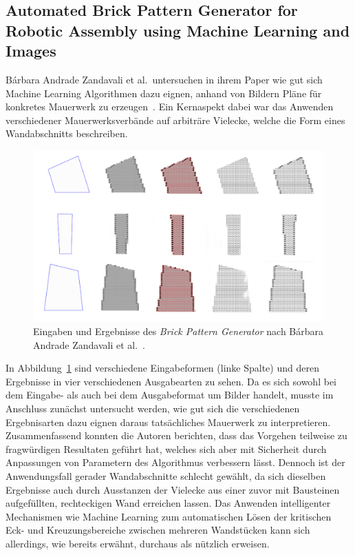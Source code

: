 \subsection{Automated Brick Pattern Generator for Robotic Assembly using Machine Learning and Images}
Bárbara Andrade Zandavali et al.\ untersuchen in ihrem Paper wie gut sich Machine Learning Algorithmen dazu eignen, anhand von Bildern Pläne für konkretes Mauerwerk zu erzeugen~\cite{Zandavali2019}.
Ein Kernaspekt dabei war das Anwenden verschiedener Mauerwerksverbände auf arbiträre Vielecke, welche die Form eines Wandabschnitts beschreiben.
\begin{figure}[ht!]
    \centering
    \includegraphics[width=0.8\columnwidth]{fig/ecaadesigradi2019_605.png}
    \caption{Eingaben und Ergebnisse des \textit{Brick Pattern Generator} nach Bárbara Andrade Zandavali et al.~\cite{Zandavali2019}.}\label{fig:related:Zandavali2019}
\end{figure}
In Abbildung~\ref{fig:related:Zandavali2019} sind verschiedene Eingabeformen (linke Spalte) und deren Ergebnisse in vier verschiedenen Ausgabearten zu sehen.
Da es sich sowohl bei dem Eingabe- als auch bei dem Ausgabeformat um Bilder handelt, musste im Anschluss zunächst untersucht werden, wie gut sich die verschiedenen Ergebnisarten dazu eignen daraus tatsächliches Mauerwerk zu interpretieren.
Zusammenfassend konnten die Autoren berichten, dass das Vorgehen teilweise zu fragwürdigen Resultaten geführt hat, welches sich aber mit Sicherheit durch Anpassungen von Parametern des Algorithmus verbessern lässt.
Dennoch ist der Anwendungsfall gerader Wandabschnitte schlecht gewählt, da sich dieselben Ergebnisse auch durch \glqq{}Ausstanzen\grqq{} der Vielecke aus einer zuvor mit Bausteinen aufgefüllten, rechteckigen Wand erreichen lassen.
Das Anwenden intelligenter Mechanismen wie Machine Learning zum automatischen Lösen der kritischen Eck- und Kreuzungsbereiche zwischen mehreren Wandstücken kann sich allerdings, wie bereits erwähnt, durchaus als nützlich erweisen.

